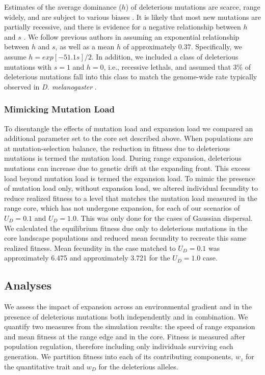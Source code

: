 Estimates of the average dominance ($h$) of deleterious mutations are scarce, range widely, and are subject to various biases \citep{Halligan:2009, Agrawal:2011}. It is likely that most new mutations are partially recessive, and there is evidence for a negative relationship between $h$ and $s$ \citep{Agrawal:2011}. We follow previous authors \citep{Lynch:1995, Deng:1996} in assuming an exponential relationship between $h$ and $s$, as well as a mean $h$ of approximately $0.37$. Specifically, we assume $h = exp[-51.1 s]/2$. In addition, we included a class of deleterious mutations with $s = 1$ and $h = 0$, i.e., recessive lethals, and assumed that $3\%$ of deleterious mutations fall into this class to match the genome-wide rate typically observed in \emph{D. melanogaster} \citep{Fry:1999}.


\subsubsection*{Mimicking Mutation Load} %
To disentangle the effects of mutation load and expansion load we compared an additional parameter set to the core set described above. When populations are at mutation-selection balance, the reduction in fitness due to deleterious mutations is termed the mutation load. During range expansion, deleterious mutations can increase due to genetic drift at the expanding front. This excess load beyond mutation load is termed the expansion load. To mimic the presence of mutation load only, without expansion load, we altered individual fecundity to reduce realized fitness to a level that matches the mutation load measured in the range core, which has not undergone expansion, for each of our scenarios of $U_D = 0.1$ and $U_D = 1.0$. This was only done for the cases of Gaussian dispersal. We calculated the equilibrium fitness due only to deleterious mutations in the core landscape populations and reduced mean fecundity to recreate this same realized fitness. Mean fecundity in the case matched to $U_D = 0.1$ was approximately 6.475 %
and approximately 3.721 %
for the $U_D = 1.0$ case.



\subsection*{Analyses}
We assess the impact of expansion across an environmental gradient and in the presence of deleterious mutations both independently and in combination. We quantify two measures from the simulation results: the speed of range expansion and mean fitness at the range edge and in the core. Fitness is measured after population regulation, therefore including only individuals surviving each generation. We partition fitness into each of its contributing components, $w_z$ for the quantitative trait and $w_D$ for the deleterious alleles. 

